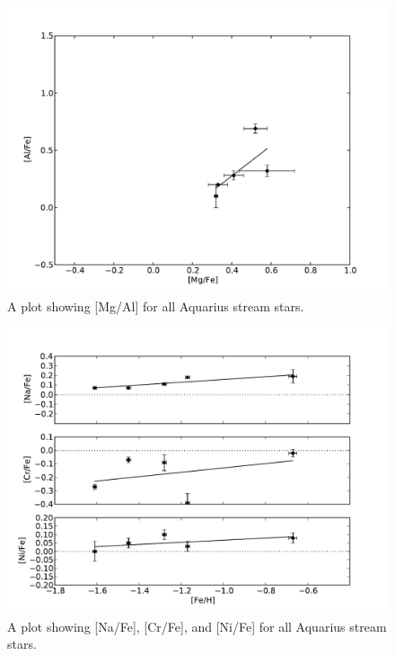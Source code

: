 \documentclass{emulateapj}
\begin{document}
\begin{figure}[h]
	\includegraphics[width=\columnwidth]{./figures/aquarius-mg-al.pdf}
	\caption{A plot showing [Mg/Al] for all Aquarius stream stars.}
	\label{fig:mg-al}
\end{figure}

\begin{figure}[h]
	\includegraphics[width=\columnwidth]{./figures/aquarius-na-cr-ni-fe.pdf}
	\caption{A plot showing [Na/Fe], [Cr/Fe], and [Ni/Fe] for all Aquarius stream stars.}
	\label{fig:na-cr-ni-fe}
\end{figure}
\end{document}
